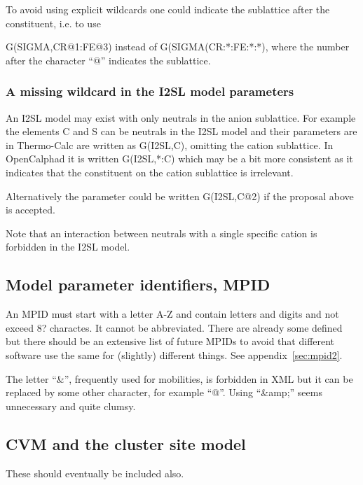 \documentclass{article}
\begin{document}
To avoid using explicit wildcards one could indicate the sublattice
after the constituent, i.e. to use

G(SIGMA,CR@1:FE@3) instead of G(SIGMA(CR:*:FE:*:*), where the number
after the character ``@'' indicates the sublattice.

\subsubsection{A missing wildcard in the I2SL model parameters}

An I2SL model may exist with only neutrals in the anion sublattice.
For example the elements C and S can be neutrals in the I2SL model and
their parameters are in Thermo-Calc are written as G(I2SL,C), omitting
the cation sublattice.  In OpenCalphad it is written G(I2SL,*:C) which
may be a bit more consistent as it indicates that the constituent on
the cation sublattice is irrelevant.

Alternatively the parameter could be written G(I2SL,C@2) if the
proposal above is accepted.

Note that an interaction between neutrals with a single specific
cation is forbidden in the I2SL model.


\newpage 

\subsection{Model parameter identifiers, MPID}\label{sec:mpid}

An MPID must start with a letter A-Z and contain letters and digits
and not exceed 8? charactes.  It cannot be abbreviated.  There are
already some defined but there should be an extensive list of future
MPIDs to avoid that different software use the same for (slightly)
different things.  See appendix~\ref{sec:mpid2}.
  
The letter ``\&'', frequently used for mobilities, is forbidden in XML
but it can be replaced by some other character, for example ``@''.
Using ``\&amp;'' seems unnecessary and quite clumsy.

\subsection{CVM and the cluster site model}

These should eventually be included also.
\end{document}
